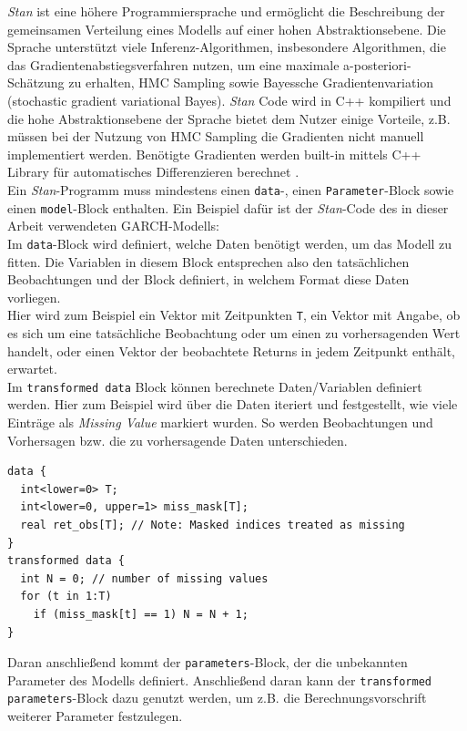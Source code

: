 \documentclass[ngerman]{ttlab-qualify}
\begin{document}
\textit{Stan} ist eine höhere Programmiersprache und ermöglicht die Beschreibung der gemeinsamen Verteilung eines Modells auf einer hohen Abstraktionsebene. Die Sprache unterstützt viele Inferenz-Algorithmen, insbesondere Algorithmen, die das Gradientenabstiegsverfahren nutzen, um eine maximale a-posteriori-Schätzung zu erhalten, HMC Sampling sowie Bayessche Gradientenvariation (stochastic gradient variational Bayes). \textit{Stan} Code wird in C++ kompiliert und die hohe Abstraktionsebene der Sprache bietet dem Nutzer einige Vorteile, z.B. müssen bei der Nutzung von HMC Sampling die Gradienten nicht manuell implementiert werden. Benötigte Gradienten werden built-in mittels C++ Library für automatisches Differenzieren berechnet \parencite{bertschinger:2018}.\\

Ein \textit{Stan}-Programm muss mindestens einen \verb|data|-, einen \verb|Parameter|-Block sowie einen \verb|model|-Block enthalten.
Ein Beispiel dafür ist der \textit{Stan}-Code des in dieser Arbeit verwendeten GARCH-Modells:\\

Im \verb|data|-Block wird definiert, welche Daten benötigt werden, um das Modell zu fitten. Die Variablen in diesem Block entsprechen also den tatsächlichen Beobachtungen und der Block definiert, in welchem Format diese Daten vorliegen.\\
Hier wird zum Beispiel ein Vektor mit Zeitpunkten \verb|T|, ein Vektor mit Angabe, ob es sich um eine tatsächliche Beobachtung oder um einen zu vorhersagenden Wert handelt, oder einen Vektor der beobachtete Returns in jedem Zeitpunkt enthält, erwartet.\\

Im \verb|transformed data| Block können berechnete Daten/Variablen definiert werden. Hier zum Beispiel wird über die Daten iteriert und festgestellt, wie viele Einträge als \textit{Missing Value} markiert wurden. So werden Beobachtungen und Vorhersagen bzw. die zu vorhersagende Daten unterschieden.

\begin{lstlisting}[style=custom]
data {
  int<lower=0> T;
  int<lower=0, upper=1> miss_mask[T];
  real ret_obs[T]; // Note: Masked indices treated as missing
}
transformed data {
  int N = 0; // number of missing values
  for (t in 1:T)
    if (miss_mask[t] == 1) N = N + 1;
}

\end{lstlisting}

Daran anschließend kommt der \verb|parameters|-Block, der die unbekannten Parameter des Modells definiert. Anschließend daran kann der \verb|transformed parameters|-Block dazu genutzt werden, um z.B. die Berechnungsvorschrift weiterer Parameter festzulegen.\\
\end{document}
